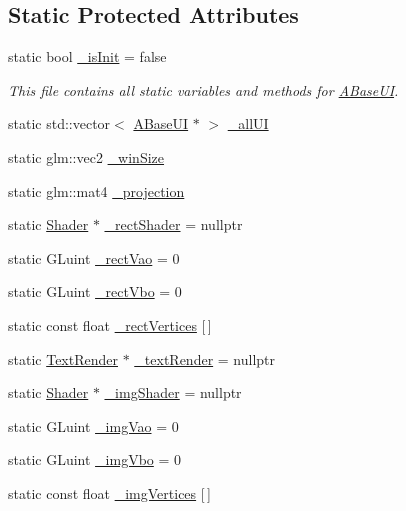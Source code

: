 \subsection*{Static Protected Attributes}
\begin{DoxyCompactItemize}
\item 
static bool \hyperlink{class_a_base_u_i_a60f7d61797925d09d4e3e887622893e3}{\+\_\+is\+Init} = false
\begin{DoxyCompactList}\small\item\em This file contains all static variables and methods for \hyperlink{class_a_base_u_i}{A\+Base\+UI}. \end{DoxyCompactList}\item 
static std\+::vector$<$ \hyperlink{class_a_base_u_i}{A\+Base\+UI} $\ast$ $>$ \hyperlink{class_a_base_u_i_a6393ba47436d10167aff033f28f01980}{\+\_\+all\+UI}
\item 
static glm\+::vec2 \hyperlink{class_a_base_u_i_acbb31dd0822594a71478ed71fdcfa15d}{\+\_\+win\+Size}
\item 
static glm\+::mat4 \hyperlink{class_a_base_u_i_a5af4bdd4c6a973b7028beea966a1efdd}{\+\_\+projection}
\item 
static \hyperlink{class_shader}{Shader} $\ast$ \hyperlink{class_a_base_u_i_a6c895ab18caa513c918f08f430eaf113}{\+\_\+rect\+Shader} = nullptr
\item 
static G\+Luint \hyperlink{class_a_base_u_i_ab3a9a0bded8effc5368922f48ef0005d}{\+\_\+rect\+Vao} = 0
\item 
static G\+Luint \hyperlink{class_a_base_u_i_aca1fd5861bd63cf8cc433f0b0ea2de7b}{\+\_\+rect\+Vbo} = 0
\item 
static const float \hyperlink{class_a_base_u_i_a3fd54dfc3e07eebcfe8ce6608d84625d}{\+\_\+rect\+Vertices} \mbox{[}$\,$\mbox{]}
\item 
static \hyperlink{class_text_render}{Text\+Render} $\ast$ \hyperlink{class_a_base_u_i_a80ebb92b19a8a1758bec4a755aaccad9}{\+\_\+text\+Render} = nullptr
\item 
static \hyperlink{class_shader}{Shader} $\ast$ \hyperlink{class_a_base_u_i_a53274b7689fa36bd667645cb80b31e3e}{\+\_\+img\+Shader} = nullptr
\item 
static G\+Luint \hyperlink{class_a_base_u_i_a3c80f46c6b5330e066106d44e9585bbb}{\+\_\+img\+Vao} = 0
\item 
static G\+Luint \hyperlink{class_a_base_u_i_aa249e0212d0d972526719fa5787d8e0b}{\+\_\+img\+Vbo} = 0
\item 
static const float \hyperlink{class_a_base_u_i_a7e00b5b45dbd6c6ec1928e548672fb40}{\+\_\+img\+Vertices} \mbox{[}$\,$\mbox{]}

\end{DoxyCompactItemize}
